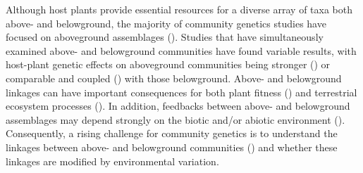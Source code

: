 \documentclass[11pt]{article}
\begin{document}


Although host plants provide essential resources for a diverse array of
taxa both above- and belowground, the majority of community genetics
studies have focused on aboveground assemblages (\citealt{Whitham_2012}).
Studies that have simultaneously examined above- and belowground
communities have found variable results, with host-plant genetic effects
on aboveground communities being stronger
(\citealt{Crutsinger_2008, Bailey_2009, wagner2016host}) or comparable and coupled
(\citealt{Crutsinger_2014}) with those belowground. Above- and belowground
linkages can have important consequences for both plant fitness
(\citealt{Whitham_2006}) and terrestrial ecosystem processes (\citealt{Wardle_2004}).
In addition, feedbacks between above- and belowground assemblages may
depend strongly on the biotic and/or abiotic environment
(\citealt{Wardle_2004}). Consequently, a rising challenge for community
genetics is to understand the linkages between above- and belowground
communities (\citealt{Crutsinger_2014, Lamit_2015}) and whether these
linkages are modified by environmental variation.
\end{document}
